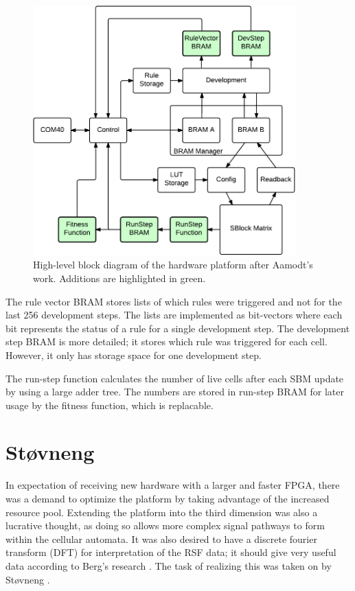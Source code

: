 \begin{figure}[!ht]
    \centering
    \includegraphics[width=0.9\textwidth]{figures/overview-aamodt}
    \caption[Aamodt's hardware design.]{
        High-level block diagram of the hardware platform after Aamodt's work.
        Additions are highlighted in green.
    }
    \label{fig:overview-aamodt}
\end{figure}

The rule vector BRAM stores lists of which rules were triggered and not for the last 256 development steps.
The lists are implemented as bit-vectors where each bit represents the status of a rule for a single development step.
The development step BRAM is more detailed; it stores which rule was triggered for each cell.
However, it only has storage space for one development step.

The run-step function calculates the number of live cells after each SBM update by using a large adder tree.
The numbers are stored in run-step BRAM for later usage by the fitness function, which is replacable.


\section{Støvneng}

In expectation of receiving new hardware with a larger and faster FPGA, there was a demand to optimize the platform by taking advantage of the increased resource pool.
Extending the platform into the third dimension was also a lucrative thought, as doing so allows more complex signal pathways to form within the cellular automata.
It was also desired to have a discrete fourier transform (DFT) for interpretation of the RSF data; it should give very useful data according to Berg's research \cite{berg2013ca}.
The task of realizing this was taken on by Støvneng \cite{stovneng2014sblock}.

